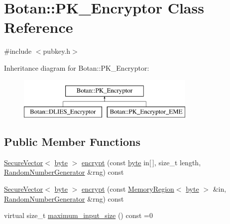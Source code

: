\hypertarget{classBotan_1_1PK__Encryptor}{\section{Botan\-:\-:P\-K\-\_\-\-Encryptor Class Reference}
\label{classBotan_1_1PK__Encryptor}
}


{\ttfamily \#include $<$pubkey.\-h$>$}

Inheritance diagram for Botan\-:\-:P\-K\-\_\-\-Encryptor\-:\begin{figure}[H]
\begin{center}
\leavevmode
\includegraphics[height=2.000000cm]{classBotan_1_1PK__Encryptor}
\end{center}
\end{figure}
\subsection*{Public Member Functions}
\begin{DoxyCompactItemize}
\item 
\hyperlink{classBotan_1_1SecureVector}{Secure\-Vector}$<$ \hyperlink{namespaceBotan_a7d793989d801281df48c6b19616b8b84}{byte} $>$ \hyperlink{classBotan_1_1PK__Encryptor_a555f0971e81ba7cb7e7933303bf295e0}{encrypt} (const \hyperlink{namespaceBotan_a7d793989d801281df48c6b19616b8b84}{byte} in\mbox{[}$\,$\mbox{]}, size\-\_\-t length, \hyperlink{classBotan_1_1RandomNumberGenerator}{Random\-Number\-Generator} \&rng) const 
\item 
\hyperlink{classBotan_1_1SecureVector}{Secure\-Vector}$<$ \hyperlink{namespaceBotan_a7d793989d801281df48c6b19616b8b84}{byte} $>$ \hyperlink{classBotan_1_1PK__Encryptor_a122704a66b624b431b7dffe1ac6a9696}{encrypt} (const \hyperlink{classBotan_1_1MemoryRegion}{Memory\-Region}$<$ \hyperlink{namespaceBotan_a7d793989d801281df48c6b19616b8b84}{byte} $>$ \&in, \hyperlink{classBotan_1_1RandomNumberGenerator}{Random\-Number\-Generator} \&rng) const 
\item 
virtual size\-\_\-t \hyperlink{classBotan_1_1PK__Encryptor_a211f9f20b0812657fcaf7a60b991d650}{maximum\-\_\-input\-\_\-size} () const =0
\end{DoxyCompactItemize}


